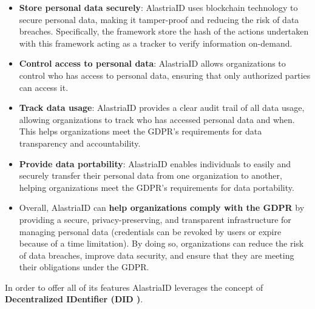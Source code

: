 \documentclass[target=mst,aauheader=]{thud}
\begin{document}
\begin{itemize}

    \item \textbf{Store personal data securely}: AlastriaID uses blockchain technology to secure personal data, making it tamper-proof and reducing the risk of data breaches. Specifically, the framework store the hash of the actions undertaken with this framework acting as a tracker to verify information on-demand.
    \item \textbf{Control access to personal data}: AlastriaID allows organizations to control who has access to personal data, ensuring that only authorized parties can access it.
    \item \textbf{Track data usage}: AlastriaID provides a clear audit trail of all data usage, allowing organizations to track who has accessed personal data and when. This helps organizations meet the GDPR's requirements for data transparency and accountability.
    \item \textbf{Provide data portability}: AlastriaID enables individuals to easily and securely transfer their personal data from one organization to another, helping organizations meet the GDPR's requirements for data portability.
    \item Overall, AlastriaID can \textbf{help organizations comply with the GDPR} by providing a secure, privacy-preserving, and transparent infrastructure for managing personal data (credentials can be revoked by users or expire because of a time limitation). By doing so, organizations can reduce the risk of data breaches, improve data security, and ensure that they are meeting their obligations under the GDPR.

\end{itemize}

In order to offer all of its features AlastriaID leverages the concept of \textbf{Decentralized IDentifier (DID \cite{DID})}.
\end{document}
